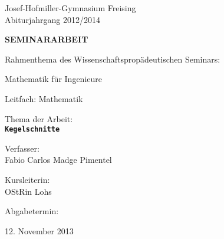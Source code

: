 \begin{titlepage}
\begin{center}


\begin{minipage}{1\textwidth}
Josef-Hofmiller-Gymnasium Freising\\
Abiturjahrgang 2012/2014
\end{minipage}

\vspace{1cm}

\textbf{\uppercase{\Large Seminararbeit}}

\vspace{1cm}

Rahmenthema des Wissenschaftspropädeutischen Seminars:

Mathematik für Ingenieure

Leitfach: Mathematik

\vspace{1cm}

{\large Thema der Arbeit:\\}
\vspace{.1cm}
\texttt{\textbf{\LARGE Kegelschnitte}}

\vfill

\begin{minipage}{0.4\textwidth}
\begin{flushleft}
Verfasser:\\
Fabio Carlos Madge Pimentel
\end{flushleft}
\end{minipage}
\begin{minipage}{0.4\textwidth}
\begin{flushright}
Kursleiterin:\\
OStRin Lohs
\end{flushright}
\end{minipage}

\vspace{0.6cm}

\begin{minipage}{0.4\textwidth}
\begin{flushleft}
Abgabetermin:
\end{flushleft}
\end{minipage}
\begin{minipage}{0.4\textwidth}
\begin{flushright}
12. November 2013
\end{flushright}
\end{minipage}

\vspace{1cm}


\end{center}
\end{titlepage}
